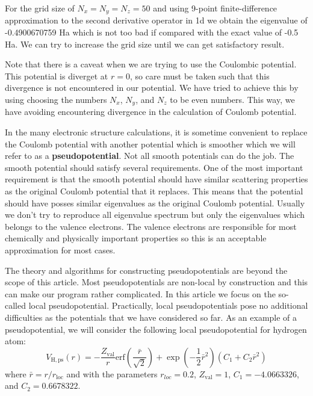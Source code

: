 For the grid size of $N_{x}=N_{y}=N_{z}=50$ and using 9-point finite-difference approximation
to the second derivative operator in 1d we obtain the eigenvalue of -0.4900670759 Ha which
is not too bad if compared with the exact value of -0.5 Ha. We can try to increase the grid
size until we can get satisfactory result.

Note that there is a caveat when we are trying to use the Coulombic potential. This potential
is diverget at $r=0$, so care must be taken such that this divergence is not encountered in
our potential. We have tried to achieve this by using choosing the numbers
$N_{x}$, $N_{y}$, and $N_{z}$ to be even numbers. This way, we have avoiding encountering
divergence in the calculation of Coulomb potential.

In the many electronic structure calculations, it is sometime convenient to replace the
Coulomb potential with another potential which is smoother which we
will refer to as a \textbf{pseudopotential}. Not all smooth
potentials can do the job. The smooth potential should satisfy several requirements.
One of the most important requirement is that the smooth potential should have similar
scattering properties as the original Coulomb potential that it replaces.
This means that the potential should have posses similar eigenvalues as the
original Coulomb potential. Usually we don't try to reproduce all eigenvalue spectrum but only
the eigenvalues which belongs to the valence electrons. The valence electrons are
responsible for most chemically and physically important properties so this is an
acceptable approximation for most cases.

The theory and algorithms for constructing pseudopotentials are beyond the scope of
this article.
Most pseudopotentials are non-local by construction and this can make our program rather
complicated.
In this article we focus on the so-called local pseudopotential. Practically, local
pseudopotentials pose no additional difficulties as the potentials that we have
considered so far. As an example of a pseudopotential, we will consider the following
local pseudopotential for hydrogen atom:
\begin{equation}
V_{\mathrm{H,ps}}(r) = -\frac{Z_{\mathrm{val}}}{r}
\mathrm{erf}\left( \frac{\bar{r}}{\sqrt{2}} \right) +
\exp\left( -\frac{1}{2}\bar{r}^2 \right)
\left( C_{1} + C_{2}\bar{r}^2 \right)
\end{equation}
where $\bar{r}=r/r_{\mathrm{loc}}$ and with the parameters $r_{loc}=0.2$, 
$Z_{\mathrm{val}}=1$, $C_{1}=-4.0663326$, and $C_{2}=0.6678322$.

